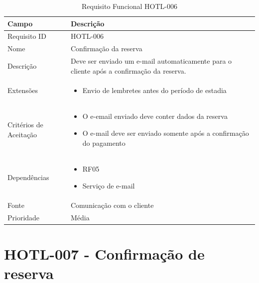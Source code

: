 \documentclass[
    12pt,
    oneside,
    a4paper,
    brazil
]{abntex2}
\begin{document}
\begin{table}[h]
	\begin{tabular}{|l|p{10cm}|}
		\hline
		\textbf{Campo} & \textbf{Descrição} \\
		\hline
		Requisito ID & HOTL-006 \\
		\hline
		Nome & Confirmação da reserva\\
		\hline
		Descrição & Deve ser enviado um e-mail automaticamente para o cliente após a confirmação da reserva. \\
		\hline
		Extensões & \begin{itemize}[leftmargin=*, labelsep=0.5em, noitemsep, topsep=0pt]
		\item Envio de lembretes antes do período de estadia
		\end{itemize} \\
		\hline
		Critérios de Aceitação & \begin{itemize}[leftmargin=*, labelsep=0.5em, noitemsep, topsep=0pt]
		\item O e-email enviado deve conter dados da reserva
		\item O e-mail deve ser enviado somente após a confirmação do pagamento
		\end{itemize} \\
		\hline
		Dependências & \begin{itemize}[leftmargin=*, labelsep=0.5em, noitemsep, topsep=0pt] 
		\item RF05
		\item Serviço de e-mail
		\end{itemize} \\
		\hline
		Fonte & Comunicação com o cliente \\
		\hline
		Prioridade & Média \\
		\hline
	\end{tabular}
	\caption{Requisito Funcional HOTL-006}
\end{table}

\section{HOTL-007 - Confirmação de reserva}
\end{document}
